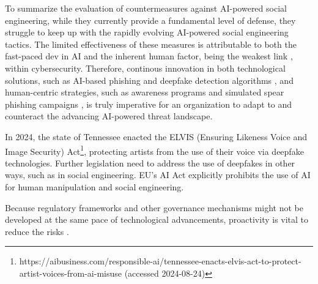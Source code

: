 To summarize the evaluation of countermeasures against AI-powered social engineering, while they currently provide a fundamental level of defense, they struggle to keep up with the rapidly evolving AI-powered social engineering tactics. The limited effectiveness of these measures is attributable to both the fast-paced dev in AI and the inherent human factor, being the weakest link \citep{mitnick_The_Art_of_Deception_2003}, within cybersecurity. Therefore, continous innovation in both technological solutions, such as AI-based phishing and deepfake detection algorithms \citep{mirskyTheCreationAndDetectionOfDeepfakes2021}, and human-centric strategies, such as awareness programs and simulated spear phishing campaigns \citep{salahdineSocialEngineeringAttacks2019}, is truly imperative for an organization to adapt to and counteract the advancing AI-powered threat landscape.

In 2024, the state of Tennessee enacted the ELVIS (Ensuring Likeness Voice and Image Security) Act\footnote{https://aibusiness.com/responsible-ai/tennessee-enacts-elvis-act-to-protect-artist-voices-from-ai-misuse (accessed 2024-08-24)}, protecting artists from the use of their voice via deepfake technologies. Further legislation need to address the use of deepfakes in other ways, such as in social engineering. EU's AI Act explicitly prohibits the use of AI for human  manipulation and social engineering.

Because regulatory frameworks and other governance mechanisms might not be developed at the same pace of technological advancements, proactivity is vital to reduce the risks \citep{blauthArtificialIntelligenceCrimeOverviewMaliciousUseAbuse2022}.